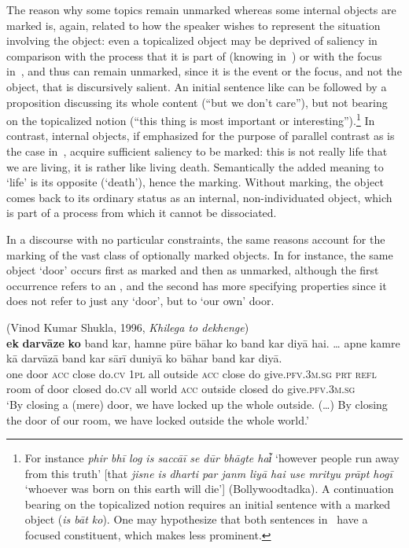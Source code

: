 \documentclass[output=paper]{LSP/langsci}
\begin{document}
The reason why some topics remain unmarked whereas some internal objects are marked is, again, related to how the speaker wishes to represent the situation involving the object: even a topicalized object may be deprived of saliency in comparison with the process that it is part of (knowing in~) or with the focus in~, and thus can remain unmarked, since it is the event or the focus, and not the object, that is discursively salient. An initial sentence like  can be followed by a proposition discussing its whole content (“but we don’t care”), but not bearing on the topicalized notion (“this thing is most important or interesting”).\footnote{For instance \textit{phir bhī log is saccāī se dūr bhāgte hai͂} ‘however people run away from this truth’ [that \textit{jisne is dharti par janm liyā hai use mrityu prāpt hogī} ‘whoever was born on this earth will die’] (Bollywoodtadka). A continuation bearing on the topicalized notion requires an initial sentence with a marked object (\textit{is bāt ko}). One may hypothesize that both sentences in~ have a focused constituent, which makes  less prominent.} In contrast, internal objects, if emphasized for the purpose of parallel contrast as is the case in~, acquire sufficient saliency to be marked: this is not really life that we are living, it is rather like living death. Semantically the added meaning to ‘life’ is its opposite (‘death’), hence the marking. Without marking, the object comes back to its ordinary status as an internal, non-individuated object, which is part of a process from which it cannot be dissociated.

In a discourse with no particular constraints, the same reasons account for the marking of the vast class of optionally marked  objects. In  for instance, the same object ‘door’ occurs first as marked and then as unmarked, although the first occurrence refers to an , and the second has more specifying properties since it does not refer to just any ‘door’, but to ‘our own’ door. 

\ea  {} (Vinod Kumar Shukla, 1996, \emph{Khilega to dekhenge})\\
\label{10-mo-ex:16}
\gll  \textbf{ek} \textbf{darvāze} \textbf{ko} band kar, hamne pūre bāhar ko band kar diyā hai. … apne kamre kā darvāzā band kar sārī duniyā ko bāhar band kar diyā.\\
 one door \textsc{acc} close do.\textsc{cv} \textsc{1pl} all outside \textsc{acc} close do %
 give.\textsc{pfv.3m.sg}  \textsc{prt} { } \textsc{refl}  room of door closed do.\textsc{cv} all world \textsc{acc} outside closed do give.\textsc{pfv.3m.sg}\\
\glt ‘By closing a (mere) door, we have locked up the whole outside. (…) By closing the door of our room, we have locked outside the whole world.’
\z
\end{document}
